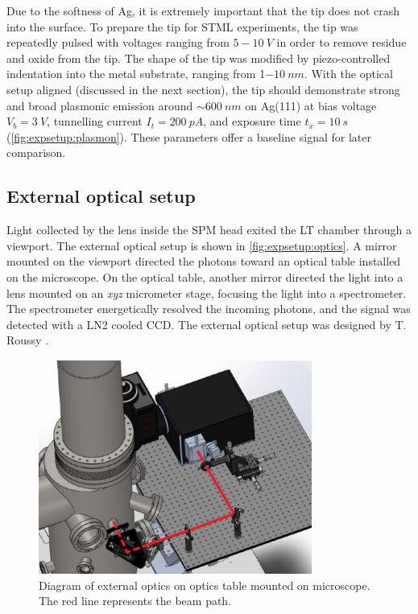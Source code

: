Due to the softness of Ag, it is extremely important that the tip does not crash into the surface. To prepare the tip for \ac{STML} experiments, the tip was repeatedly pulsed with voltages ranging from $5-\SI{10}{V}$ in order to remove residue and oxide from the tip. The shape of the tip was modified by piezo-controlled indentation into the metal substrate, ranging from 1$\SI{-10}{nm}$. With the optical setup aligned (discussed in the next section), the tip should demonstrate strong and broad plasmonic emission around $\sim \SI{600}{nm}$ on Ag(111) at bias voltage $V_b = \SI{3}{V}$, tunnelling current $I_t = \SI{200}{pA}$, and exposure time $t_x = \SI{10}{s}$ (\autoref{fig:expsetup:plasmon}). These parameters offer a baseline signal for later comparison.




\subsection{External optical setup}

Light collected by the lens inside the \ac{SPM} head exited the \ac{LT} chamber through a viewport. The external optical setup is shown in \autoref{fig:expsetup:optics}. A mirror mounted on the viewport directed the photons toward an optical table installed on the microscope. On the optical table, another mirror directed the light into a lens mounted on an \textit{xyz} micrometer stage, focusing the light into a spectrometer. The spectrometer energetically resolved the incoming photons, and the signal was detected with a \ac{LN2} cooled \ac{CCD}. The external optical setup was designed by T. Roussy \citep{roussy2016coupling}.

\begin{figure} [h]
    \centering
    \includegraphics[width=0.8\textwidth]{pictures/optics_line.png}
    \caption{Diagram of external optics on optics table mounted on microscope. The red line represents the beam path.}
    \label{fig:expsetup:optics}
\end{figure}

